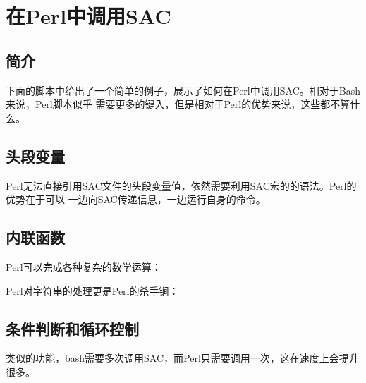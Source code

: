 \section{在Perl中调用SAC}

\subsection{简介}
下面的脚本中给出了一个简单的例子，展示了如何在Perl中调用SAC。相对于Bash来说，Perl脚本似乎
需要更多的键入，但是相对于Perl的优势来说，这些都不算什么。


\subsection{头段变量}
Perl无法直接引用SAC文件的头段变量值，依然需要利用SAC宏的的语法。Perl的优势在于可以
一边向SAC传递信息，一边运行自身的命令。


\subsection{内联函数}
Perl可以完成各种复杂的数学运算：


Perl对字符串的处理更是Perl的杀手锏：


\subsection{条件判断和循环控制}
类似的功能，bash需要多次调用SAC，而Perl只需要调用一次，这在速度上会提升很多。

